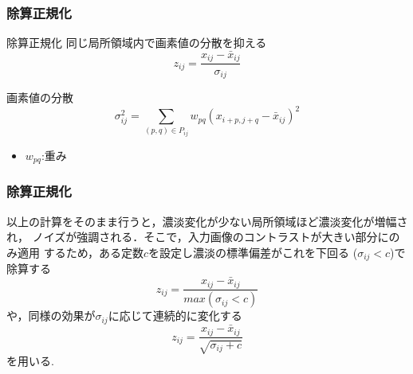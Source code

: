 \documentclass[dvipdfmx,11pt,notheorems]{beamer}
\theoremstyle{definition}
\begin{document}
\begin{frame}[fragile]\frametitle{除算正規化}
 \begin{block}{除算正規化}
同じ局所領域内で画素値の分散を抑える
 \begin{equation}
 z_{ij}=\frac{x_{ij}-\bar{x}_{ij}}{\sigma_{ij}}
 \end{equation}
 \end{block}
画素値の分散
 \begin{equation}
 \sigma^2_{ij}=\sum_{(p,q)\in{P_{ij}}}^{} w_{pq}(x_{i+p,j+q}-\bar{x}_{ij})^2
 \end{equation}

 \begin{itemize}
 \item $w_{pq}$:重み
 \end{itemize}

\end{frame}

\begin{frame}[fragile]\frametitle{除算正規化}
以上の計算をそのまま行うと，濃淡変化が少ない局所領域ほど濃淡変化が増幅され，
ノイズが強調される．そこで，入力画像のコントラストが大きい部分にのみ適用
するため，ある定数$c$を設定し濃淡の標準偏差がこれを下回る
($\sigma_{ij}<c$)で除算する
\begin{equation}
 z_{ij}=\frac{x_{ij}-\bar{x}_{ij}}{max(\sigma_{ij}<c)}
\end{equation}
や，同様の効果が$\sigma_{ij}$に応じて連続的に変化する
\begin{equation}
 z_{ij}=\frac{x_{ij}-\bar{x}_{ij}}{\sqrt{\sigma_{ij}+c}}
\end{equation}
を用いる.
\end{frame}


\end{document}
